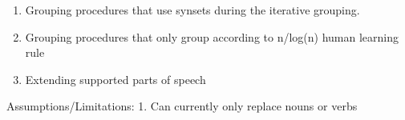 \documentclass[11pt]{article}
\begin{document}
\begin{enumerate}
\def\labelenumi{\arabic{enumi}.}
\item
  Grouping procedures that use synsets during the iterative grouping.
\item
  Grouping procedures that only group according to n/log(n) human
  learning rule
\item
  Extending supported parts of speech
\end{enumerate}

    Assumptions/Limitations: 1. Can currently only replace nouns or verbs


    
    
    
    
\end{document}
